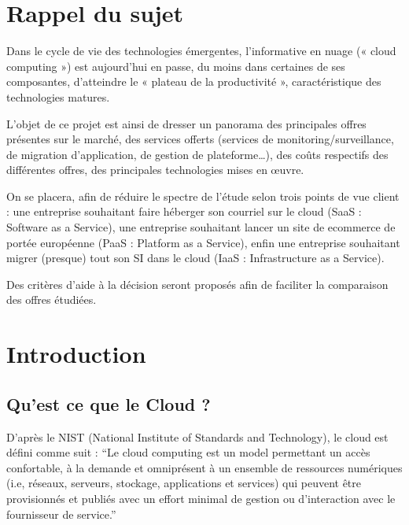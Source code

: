 \documentclass[11pt]{book}
\begin{document}
\mdxtitleblockstart{}
\mdxauthorstart{}
\mdxauthorend\mdxtitleblockend%
\section{Rappel du sujet}\label{sec-rappel-du-sujet}%

\noindent{}Dans le cycle de vie des technologies émergentes, l’informative en nuage (« cloud computing ») est aujourd’hui en
passe, du moins dans certaines de ses composantes, d’atteindre le « plateau de la productivité », caractéristique des
technologies matures.%

L’objet de ce projet est ainsi de dresser un panorama des principales offres présentes sur le marché, des services
offerts (services de monitoring/surveillance, de migration d’application, de gestion de plateforme\dots{}), des coûts respectifs
des différentes offres, des principales technologies mises en œuvre.%

On se placera, afin de réduire le spectre de l’étude selon trois points de vue client : une entreprise souhaitant faire
héberger son courriel sur le cloud (SaaS : Software as a Service), une entreprise souhaitant lancer un site de ecommerce de portée européenne (PaaS : Platform as a Service), enfin une entreprise souhaitant migrer (presque) tout
son SI dans le cloud (IaaS : Infrastructure as a Service).%

Des critères d’aide à la décision seront proposés afin de faciliter la comparaison des offres étudiées.%

\section{Introduction}\label{sec-introduction}%

\subsection{Qu'est ce que le Cloud ?}\label{sec-quest-ce-que-le-cloud-}%

\noindent{}D'après le NIST (National Institute of Standards and Technology), le cloud est défini comme suit : 
 \textquotedblleft{}Le cloud computing est un model permettant un accès confortable, à la demande et omniprésent à un
  ensemble de ressources numériques (i.e, réseaux, serveurs, stockage, applications et services) qui peuvent être provisionnés
  et publiés avec un effort minimal de gestion ou d'interaction avec le fournisseur de service.\textquotedblright{}%
\end{document}
